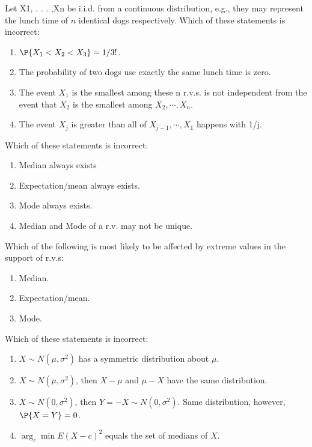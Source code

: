 \documentclass[poll_tutorial_format]{subfiles}
\begin{document}
	
	\begin{exercise}
		Let X1, . . . ,Xn be i.i.d. from a continuous distribution, e.g., they may represent the lunch time of $n$ identical dogs respectively.
		Which of these statements is incorrect:
		\begin{enumerate}
			\item $\P{X_1<X_2<X_3}=1/3!$.
			\item The probability of two dogs use exactly the same lunch time is zero.		
			\item The event $X_1$ is the smallest among these n r.v.s. is not independent from the event that $X_2$ is the smallest among $X_2,\cdots, X_n$.
			\item The event $X_j$ is greater than all of
			$X_{j-1},\cdots,X_1$ happens with 1/j.
		\end{enumerate}
	\end{exercise}
	
	
	\begin{exercise}
		Which of these statements is incorrect:
		\begin{enumerate}
			\item Median always exists 
			\item Expectation/mean always exists.
			\item Mode always exists.
			\item Median and Mode of a r.v. may not be unique. 
		\end{enumerate}
	\end{exercise}
	
	
	
	\begin{exercise}
		Which of the following is most likely to be affected by extreme values in the support of r.v.s:
		\begin{enumerate}
			\item Median.
			\item Expectation/mean.
			\item Mode. 
		\end{enumerate}
	\end{exercise}
	
	
	
	\begin{exercise}
		Which of these statements is incorrect: 
		\begin{enumerate}
			\item $X\sim N(\mu,\sigma^2)$ has a symmetric
			distribution about $\mu$.
			\item $X\sim N(\mu,\sigma^2)$, then $X-\mu$ and $\mu-X$ have the same distribution.
			\item $X\sim N(0,\sigma^2)$, then $Y=-X\sim N(0,\sigma^2)$. Same distribution, however, $\P{X=Y}=0$.   
			\item $\arg_c \min E(X-c)^2$ equals the set of medians of $X$.   
		\end{enumerate}
	\end{exercise}
	
\end{document}
